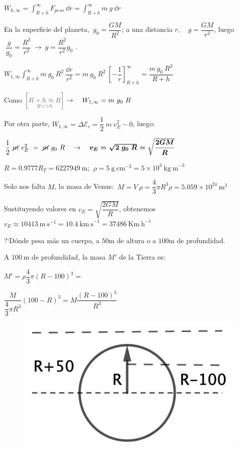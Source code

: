 $W_{h,\infty}=\displaystyle \int_{R+h}^\infty F_{peso} \ \dd r = \int_{R+h}^\infty m\ g\ \dd r$

En la superficie del planeta, $\ g_0=\dfrac{GM}{R^2}$; a una distancia $r,\quad g=\dfrac{GM}{r^2}$, luego $\ \dfrac{g}{g_0}=\dfrac{R^2}{r^2}\ \to \ g=\dfrac{R^2}{r^2}g_0$ .

$\displaystyle W_{1,\infty} \int_{R+h}^\infty m\ g_0\ R^2 \ \dfrac{\dd r}{r^2} = m\ g_0 \ R^2 \ {\left[ -\dfrac 1 r\right]}_{R+h}^\infty=\dfrac {m\ g_0\ R^2}{R+h}$

Como $ \textcolor{gris}{\left[ \underset{R>>h}{R+h\approx R} \right]} \to \quad W_{1,\infty}= m\ g_0\ R$

Por otra parte, $W_{1,\infty}=\Delta \mathcal E_c=\dfrac 1 2 \ m \ v_E^2-0$, luego:

$\dfrac 1 2 \ \cancel{m} \ v_E^2 \ = \ \cancel{m} \ g_0\ R \quad \to \quad  \boldsymbol{v_E=\sqrt{2\ g_0\ R}= \sqrt{\dfrac{2GM}{R}}}$

$R=0.9777 R_T=6227949 \ \textrm{m}$; $\ \rho=5\ \mathrm{g\ cm}^{-3}=5 \times 10^{3}\ \mathrm{kg\ m}^{-3}$

Solo nos falta $M$, la masa de Venus: $\ M=V\ \rho = \dfrac 4 3 \pi R^3 \rho= 5.059\times 10^{24}\ \mathrm{m}^3$

Sustituyendo valores en $v_E= \sqrt{\dfrac{2GM}{R}}$, obtenemos \ $v_E\approx 10413 \ \mathrm{m\ s}^{-1}=10.4 \ \mathrm{km\ s}^{-1} = 37486  \ \mathrm{Km\ h}^{-1}$

\begin{prob}
?`Dónde pesa más un cuerpo, a $50 \mathrm{m}$  de altura	 o a $100 \mathrm{m}$ de profundidad.
\end{prob}
\begin{multicols}{2}
A $100 \ \mathrm{m}$ de profundidad, la masa $M'$ de la Tierra es:

\small{$M'=\rho \dfrac 4 3 \pi (R-100)^3=$}

\small{$ \dfrac{M}{\dfrac 4 3 \pi R^3} (100-R)^3= M \dfrac{(R-100)^3}{R^3}$}
\begin{figure}[H]
	\centering
	\includegraphics[width=.35\textwidth]{imagenes/imagenes15/T15IM08.png}
\end{figure}		
\end{multicols}

